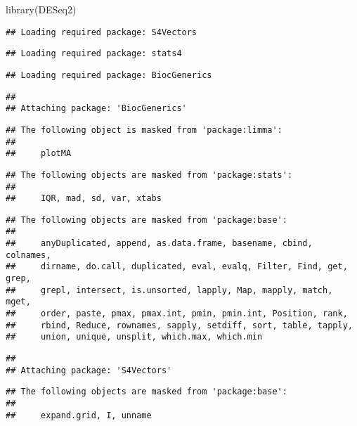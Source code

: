 \documentclass[
]{article}
\newenvironment{Shaded}{\begin{snugshade}}{\end{snugshade}}
\newcommand{\FunctionTok}[1]{\textcolor[rgb]{0.00,0.00,0.00}{#1}}
\newcommand{\NormalTok}[1]{#1}
\begin{document}
\begin{Shaded}
\begin{Highlighting}[]
\FunctionTok{library}\NormalTok{(DESeq2)}
\end{Highlighting}
\end{Shaded}

\begin{verbatim}
## Loading required package: S4Vectors
\end{verbatim}

\begin{verbatim}
## Loading required package: stats4
\end{verbatim}

\begin{verbatim}
## Loading required package: BiocGenerics
\end{verbatim}

\begin{verbatim}
## 
## Attaching package: 'BiocGenerics'
\end{verbatim}

\begin{verbatim}
## The following object is masked from 'package:limma':
## 
##     plotMA
\end{verbatim}

\begin{verbatim}
## The following objects are masked from 'package:stats':
## 
##     IQR, mad, sd, var, xtabs
\end{verbatim}

\begin{verbatim}
## The following objects are masked from 'package:base':
## 
##     anyDuplicated, append, as.data.frame, basename, cbind, colnames,
##     dirname, do.call, duplicated, eval, evalq, Filter, Find, get, grep,
##     grepl, intersect, is.unsorted, lapply, Map, mapply, match, mget,
##     order, paste, pmax, pmax.int, pmin, pmin.int, Position, rank,
##     rbind, Reduce, rownames, sapply, setdiff, sort, table, tapply,
##     union, unique, unsplit, which.max, which.min
\end{verbatim}

\begin{verbatim}
## 
## Attaching package: 'S4Vectors'
\end{verbatim}

\begin{verbatim}
## The following objects are masked from 'package:base':
## 
##     expand.grid, I, unname
\end{verbatim}
\end{document}
